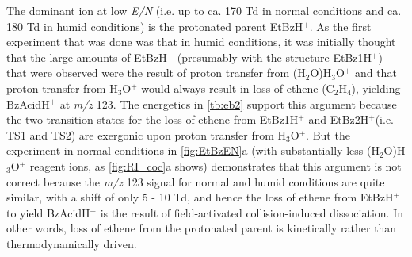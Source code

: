 The dominant ion at low \textit{E/N} (i.e. up to ca. 170 Td in normal conditions and ca. 180 Td in humid conditions) is the protonated parent EtBzH$^+$.
%
%
%
As the first experiment that was done was that in humid conditions, it was initially thought that the large amounts of EtBzH$^+$ (presumably with the structure EtBz1H$^+$) that were observed  were the result of proton transfer from (H$_2$O)H$_3$O$^+$ and that proton transfer from H$_3$O$^+$ would always result in loss of ethene  (C$_2$H$_4$), yielding BzAcidH$^+$ at \textit{m/z} 123. The energetics in \autoref{tb:eb2} support this argument because the two transition states for the loss of ethene from EtBz1H$^+$ and EtBz2H$^+$(i.e. TS1 and TS2) are exergonic upon proton transfer from H$_3$O$^+$.
%
But the experiment in normal conditions in \autoref{fig:EtBzEN}a (with substantially less (H$_2$O)H$_3$O$^+$ reagent ions, as \autoref{fig:RI_coc}a shows) demonstrates that this argument is not correct because the \textit{m/z} 123 signal for normal and humid conditions are quite similar, with a shift of only 5 - 10 Td, and hence the loss of ethene from EtBzH$^+$ to yield BzAcidH$^+$ is the result of field-activated collision-induced dissociation.
%
In other words, loss of ethene from the protonated parent is kinetically rather than thermodynamically driven.








%

